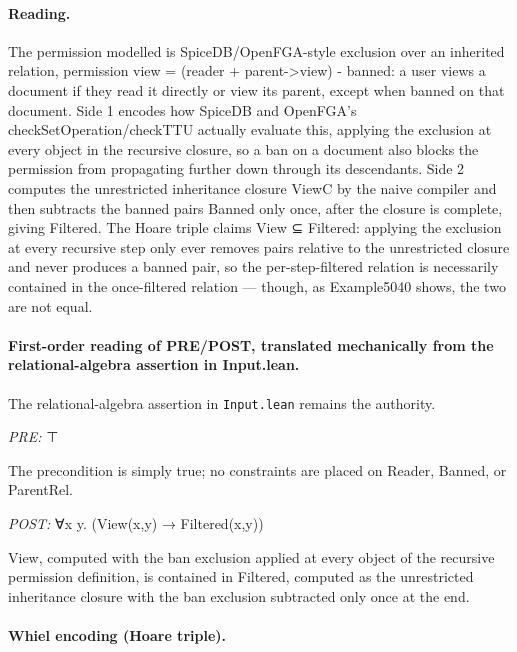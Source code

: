 \documentclass[10pt]{article}
\begin{document}
\paragraph{Reading.} The permission modelled is SpiceDB/OpenFGA-style exclusion over an inherited relation, permission view = (reader + parent-\textgreater{}view) - banned: a user views a document if they read it directly or view its parent, except when banned on that document. Side 1 encodes how SpiceDB and OpenFGA's checkSetOperation/checkTTU actually evaluate this, applying the exclusion at every object in the recursive closure, so a ban on a document also blocks the permission from propagating further down through its descendants. Side 2 computes the unrestricted inheritance closure ViewC by the naive compiler and then subtracts the banned pairs Banned only once, after the closure is complete, giving Filtered. The Hoare triple claims View ⊆ Filtered: applying the exclusion at every recursive step only ever removes pairs relative to the unrestricted closure and never produces a banned pair, so the per-step-filtered relation is necessarily contained in the once-filtered relation --- though, as Example5040 shows, the two are not equal.

\paragraph{First-order reading of PRE/POST, translated mechanically from the relational-algebra assertion in Input.lean.} The relational-algebra assertion in \texttt{Input.lean} remains the authority.

\textit{PRE:} ⊤\par The precondition is simply true; no constraints are placed on Reader, Banned, or ParentRel.

\textit{POST:} ∀x y. (View(x,y) → Filtered(x,y))\par View, computed with the ban exclusion applied at every object of the recursive permission definition, is contained in Filtered, computed as the unrestricted inheritance closure with the ban exclusion subtracted only once at the end.

\paragraph{Whiel encoding (Hoare triple).}
\end{document}

